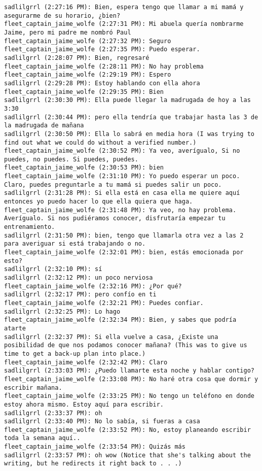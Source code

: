 \begin{verbatim}
sadlilgrrl (2:27:16 PM): Bien, espera tengo que llamar a mi mamá y asegurarme de su horario, ¿bien?
fleet_captain_jaime_wolfe (2:27:31 PM): Mi abuela quería nombrarme Jaime, pero mi padre me nombró Paul
fleet_captain_jaime_wolfe (2:27:32 PM): Seguro
fleet_captain_jaime_wolfe (2:27:35 PM): Puedo esperar.
sadlilgrrl (2:28:07 PM): Bien, regresaré
fleet_captain_jaime_wolfe (2:28:11 PM): No hay problema
fleet_captain_jaime_wolfe (2:29:19 PM): Espero
sadlilgrrl (2:29:28 PM): Estoy hablando con ella ahora
fleet_captain_jaime_wolfe (2:29:35 PM): Bien
sadlilgrrl (2:30:30 PM): Ella puede llegar la madrugada de hoy a las 3:30
sadlilgrrl (2:30:44 PM): pero ella tendría que trabajar hasta las 3 de la madrugada de mañana
sadlilgrrl (2:30:50 PM): Ella lo sabrá en media hora (I was trying to find out what we could do without a verified number.)
fleet_captain_jaime_wolfe (2:30:52 PM): Ya veo, averígualo, Si no puedes, no puedes. Si puedes, puedes.
fleet_captain_jaime_wolfe (2:30:53 PM): bien
fleet_captain_jaime_wolfe (2:31:10 PM): Yo puedo esperar un poco. Claro, puedes preguntarle a tu mamá si puedes salir un poco.
sadlilgrrl (2:31:28 PM): Si ella está en casa ella me quiere aquí entonces yo puedo hacer lo que ella quiera que haga.
fleet_captain_jaime_wolfe (2:31:48 PM): Ya veo, no hay problema. Averígualo. Si nos pudiéramos conocer, disfrutaría empezar tu entrenamiento. 
sadlilgrrl (2:31:50 PM): bien, tengo que llamarla otra vez a las 2 para averiguar si está trabajando o no.
fleet_captain_jaime_wolfe (2:32:01 PM): bien, estás emocionada por esto?
sadlilgrrl (2:32:10 PM): sí
sadlilgrrl (2:32:12 PM): un poco nerviosa
fleet_captain_jaime_wolfe (2:32:16 PM): ¿Por qué?
sadlilgrrl (2:32:17 PM): pero confío en ti
fleet_captain_jaime_wolfe (2:32:21 PM): Puedes confiar.
sadlilgrrl (2:32:25 PM): Lo hago
fleet_captain_jaime_wolfe (2:32:34 PM): Bien, y sabes que podría atarte
sadlilgrrl (2:32:37 PM): Si ella vuelve a casa, ¿Existe una posibilidad de que nos podamos conocer mañana? (This was to give us time to get a back-up plan into place.)
fleet_captain_jaime_wolfe (2:32:42 PM): Claro
sadlilgrrl (2:33:03 PM): ¿Puedo llamarte esta noche y hablar contigo?
fleet_captain_jaime_wolfe (2:33:08 PM): No haré otra cosa que dormir y escribir mañana.
fleet_captain_jaime_wolfe (2:33:25 PM): No tengo un teléfono en donde estoy ahora mismo. Estoy aquí para escribir.
sadlilgrrl (2:33:37 PM): oh
sadlilgrrl (2:33:40 PM): No lo sabía, si fueras a casa
fleet_captain_jaime_wolfe (2:33:52 PM): No, estoy planeando escribir toda la semana aquí..
fleet_captain_jaime_wolfe (2:33:54 PM): Quizás más
sadlilgrrl (2:33:57 PM): oh wow (Notice that she's talking about the writing, but he redirects it right back to . . .)

\end{verbatim}
